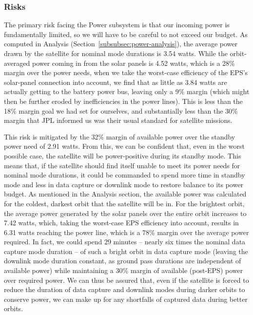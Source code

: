 \documentclass[12pt]{article}
\begin{document}
			\subsubsection{Risks}

The primary risk facing the Power subsystem is that our incoming power is fundamentally limited, so we will have to be careful to not exceed our budget.  As computed in Analysis (Section~\ref{subsubsec:power-analysis}), the average power drawn by the satellite for nominal mode durations is 3.54 watts.  While the orbit-averaged power coming in from the solar panels is 4.52 watts, which is a 28\% margin over the power needs, when we take the worst-case efficiency of the EPS's solar-panel connection into account\cite{EPS manual}, we find that as little as 3.84 watts are actually getting to the battery power bus, leaving only a 9\% margin (which might then be further eroded by inefficiencies in the power lines).  This is less than the 18\% margin goal we had set for ourselves, and substantially less than the 30\% margin that JPL informed us was their usual standard for satellite missions.

This risk is mitigated by the 32\% margin of available power over the standby power need of 2.91 watts.  From this, we can be confident that, even in the worst possible case, the satellite will be power-positive during its standby mode.  This means that, if the satellite should find itself unable to meet its power needs for nominal mode durations, it could be commanded to spend more time in standby mode and less in data capture or downlink mode to restore balance to its power budget.  As mentioned in the Analysis section, the available power was calculated for the coldest, darkest orbit that the satellite will be in.  For the brightest orbit, the average power generated by the solar panels over the entire orbit increases to 7.42 watts, which, taking the worst-case EPS efficiency into account, results in 6.31 watts reaching the power line, which is a 78\% margin over the average power required.  In fact, we could spend 29 minutes -- nearly six times the nominal data capture mode duration -- of such a bright orbit in data capture mode (leaving the downlink mode duration constant, as ground pass durations are independent of available power) while maintaining a 30\% margin of available (post-EPS) power over required power.  We can thus be assured that, even if the satellite is forced to reduce the duration of data capture and downlink modes during darker orbits to conserve power, we can make up for any shortfalls of captured data during better orbits.
\end{document}
